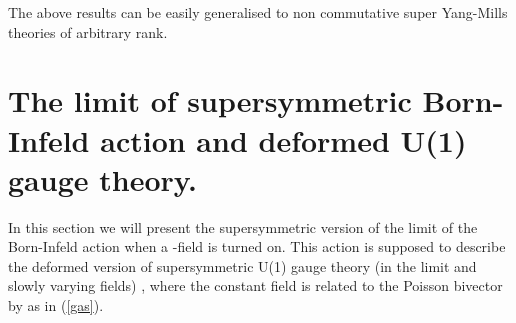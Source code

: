 \documentclass[a4paper,12pt]{article}
\begin{document}
 The above results can be easily generalised to non commutative super
Yang-Mills theories of 
arbitrary rank. 


\section{The \coordHE{} limit of supersymmetric Born-Infeld action
and deformed
 U(1) gauge theory.}

In this section we will present the supersymmetric version of the
\coordHE{}
 limit of the Born-Infeld action when a \coordHE{}-field is turned on. This
action is supposed 
to describe the deformed version of supersymmetric U(1) gauge theory (in
the limit
 \coordHE{} and slowly varying
fields) \cite{sw},  where the 
constant field \coordHE{} is related to the Poisson bivector by 
\coordHE{} as in (\ref{gas}).
\end{document}
